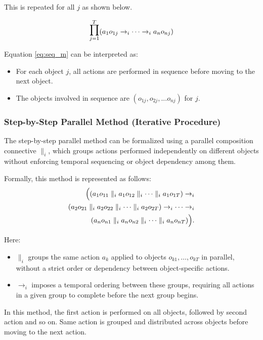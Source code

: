 \documentclass[a4paper,11pt]{lmcs}
\newcommand{\bigseq}{\mathop{\raisebox{0.3ex}{\scalebox{1.5}{$\prod$}}}}
\begin{document}
This is repeated for all $j$ as shown below.


\begin{eqnarray}
\label{eq:seq_m}
\bigseq_{j=1}^T (a_1 o_{1j} \rightarrow_i \cdots \rightarrow_i a_n o_{nj})
\end{eqnarray}


Equation \ref{eq:seq_m} can be interpreted as:
\begin{itemize}
 \item For each object $j$, all actions are performed in sequence before moving to the next object.
 \item The objects involved in sequence are $(o_{1j},o_{2j},...o_{nj})$ for $j$.
\end{itemize}

\subsubsection{Step-by-Step Parallel Method (Iterative Procedure)}
The step-by-step parallel method can be formalized using a parallel composition connective \(\parallel_i\), which groups actions performed independently on different objects without enforcing temporal sequencing or object dependency among them.

Formally, this method is represented as follows:
\begin{eqnarray}
\label{eq:step_parallel_formal}
\Bigl(
(a_1 o_{11} \parallel_i a_1 o_{12} \parallel_i \cdots \parallel_i a_1 o_{1T})
\rightarrow_i \\ \nonumber
(a_2 o_{21} \parallel_i a_2 o_{22} \parallel_i \cdots \parallel_i a_2 o_{2T})
\rightarrow_i \cdots \rightarrow_i \\ \nonumber
(a_n o_{n1} \parallel_i a_n o_{n2} \parallel_i \cdots \parallel_i a_n o_{nT})
\Bigr).
\end{eqnarray}

Here:
\begin{itemize}
  \item \(\parallel_i\) groups the same action \(a_k\) applied to objects \(o_{k1}, \ldots, o_{kT}\) in parallel, without a strict order or dependency between object-specific actions.
  \item \(\rightarrow_i\) imposes a temporal ordering between these groups, requiring all actions in a given group to complete before the next group begins.
\end{itemize}

In this method, the first action is performed on all objects, followed by second action and so on. Same action is grouped and distributed across objects before moving to the next action.
\end{document}
